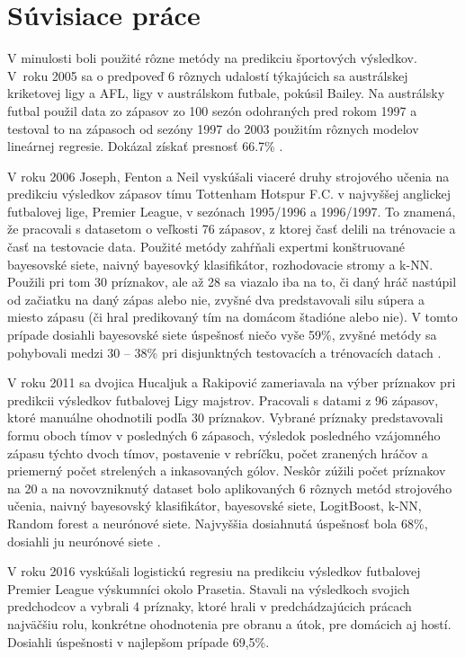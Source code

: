 \section*{Súvisiace práce}

V minulosti boli použité rôzne metódy na predikciu športových výsledkov.
V~roku 2005 sa o predpoveď 6 rôznych udalostí týkajúcich sa austrálskej kriketovej ligy a AFL, ligy v austrálskom futbale, pokúsil Bailey. 
Na austrálsky futbal použil data zo zápasov zo 100 sezón odohraných pred rokom 1997 a testoval to na zápasoch od sezóny 1997 do 2003 použitím rôznych modelov lineárnej regresie. 
Dokázal získať presnosť 66.7\% \citep{related:bailey}.

V roku 2006 Joseph, Fenton a Neil vyskúšali viaceré druhy strojového učenia na predikciu výsledkov zápasov tímu Tottenham Hotspur F.C. v najvyššej anglickej futbalovej lige, Premier League, v sezónach 1995/1996 a 1996/1997.
To znamená, že pracovali s datasetom o veľkosti 76 zápasov, z ktorej časť delili na trénovacie a časť na testovacie data. 
Použité metódy zahŕňali expertmi konštruované bayesovské siete, naivný bayesovký klasifikátor, rozhodovacie stromy a k-NN. 
Použili pri tom 30 príznakov, ale až 28 sa viazalo iba na to, či daný hráč nastúpil od začiatku na daný zápas alebo nie, zvyšné dva predstavovali silu súpera a miesto zápasu (či hral predikovaný tím na domácom štadióne alebo nie).
V tomto prípade dosiahli bayesovské siete úspešnosť niečo vyše 59\%, zvyšné metódy sa pohybovali medzi 30 -- 38\% pri disjunktných testovacích a trénovacích datach  \citep{related:joseph}.

V roku 2011 sa dvojica Hucaljuk a Rakipovi{\'c} zameriavala na výber príznakov pri predikcii výsledkov futbalovej Ligy majstrov. 
Pracovali s datami z 96 zápasov, ktoré manuálne ohodnotili podľa 30 príznakov.
Vybrané príznaky predstavovali formu oboch tímov v posledných 6 zápasoch, výsledok posledného vzájomného zápasu týchto dvoch tímov, postavenie v rebríčku, počet zranených hráčov a priemerný počet strelených a inkasovaných gólov.
Neskôr zúžili počet príznakov na 20 a na novovzniknutý dataset bolo aplikovaných 6 rôznych metód strojového učenia, naivný bayesovský klasifikátor, bayesovské siete, LogitBoost, k-NN, Random forest a neurónové siete. Najvyššia dosiahnutá úspešnosť bola 68\%, dosiahli ju neurónové siete \citep{related:hucaljuk}.

V roku 2016 vyskúšali logistickú regresiu na predikciu výsledkov futbalovej Premier League výskumníci okolo Prasetia. 
Stavali na výsledkoch svojich predchodcov a vybrali 4 príznaky, ktoré hrali v predchádzajúcich prácach najväčšiu rolu, konkrétne ohodnotenia pre obranu a útok, pre domácich aj hostí.
Dosiahli úspešnosti v najlepšom prípade 69,5\%.\citep{related:prasetio}

